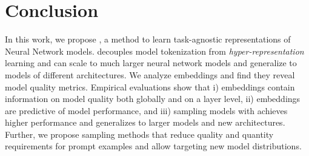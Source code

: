 \section{Conclusion}

In this work, we propose \ourmethod, a method to learn task-agnostic representations of Neural Network models. \ourmethod decouples model tokenization from \textit{hyper-representation} learning and can scale to much larger neural network models and generalize to models of different architectures. 
We analyze \ourmethod embeddings and find they reveal model quality metrics. Empirical evaluations show that 
i) \ourmethod embeddings contain information on model quality both globally and on a layer level,
ii) \ourmethod embeddings are predictive of model performance, and 
iii) sampling models with \ourmethod achieves higher performance and generalizes to larger models and new architectures. Further, we propose sampling methods that reduce quality and quantity requirements for prompt examples and allow targeting new model distributions.

